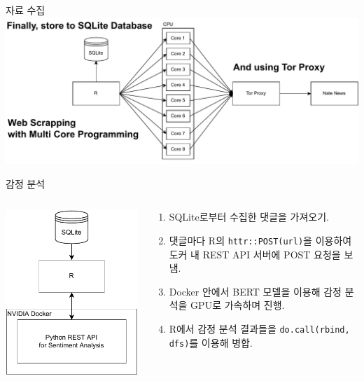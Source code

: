\documentclass[mathserif, aspectratio=169]{beamer}
\begin{document}
\begin{frame}{자료 수집}
    \includegraphics[width = \linewidth]{images/data_scrap.pdf}
\end{frame}
\begin{frame}{감정 분석}
    \begin{columns}
        \begin{column}{0.3\linewidth}
            \centering
            \includegraphics[width = 0.8\linewidth]{images/sentiment_analysis.pdf}
        \end{column}
        \begin{column}{0.7\linewidth}
            \begin{enumerate}
                \item SQLite로부터 수집한 댓글을 가져오기.
                \item 댓글마다 R의 \texttt{httr::POST(url)}을 이용하여 도커 내 REST API 서버에 POST 요청을 보냄.
                \item Docker 안에서 BERT 모델을 이용해 감정 분석을 GPU로 가속하며 진행.
                \item R에서 감정 분석 결과들을 \texttt{do.call(rbind, dfs)}를 이용해 병합.
            \end{enumerate}
        \end{column}
    \end{columns}
\end{frame}
\end{document}
